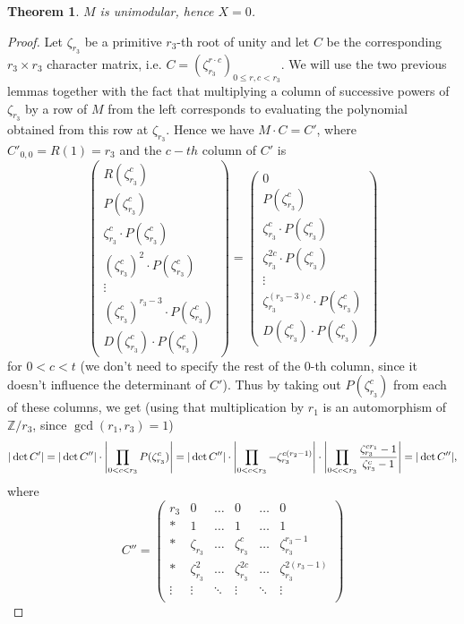 \documentclass[12pt,a4paper]{article}
\newtheorem{theorem}{Theorem}
\theoremstyle{definition}
\newcommand{\Z}{\mathbb{Z}}
\newcommand{\zt}{\zeta_{r_3}}
\DeclarePairedDelimiter\abs{\lvert}{\rvert}
\begin{document}
\begin{theorem}
$M$ is unimodular, hence $X=0$.
\end{theorem}
\begin{proof}
Let $\zt$ be a primitive $r_3$-th root of unity and let $C$ be the corresponding $r_3\times r_3$ character matrix, i.e. $C=(\zt^{r\cdot c})_{0\leq r,c<r_3}$. We will use the two previous lemmas together with the fact that multiplying a column of successive powers of $\zt$ by a row of $M$ from the left corresponds to evaluating the polynomial obtained from this row at $\zt$. %
Hence we have $M\cdot C=C'$, where $C'_{0,0}=R(1)=r_3$ and the $c-th$ column of $C'$ is
$$
\begin{pmatrix}
R(\zt^c)\\ 
P(\zt^c) \\ 
\zt^c \cdot P(\zt^c) \\ 
(\zt^{c})^2 \cdot P(\zt^c) \\ 
\vdots\\ 
(\zt^{c})^{r_3-3} \cdot P(\zt^c) \\ 
D(\zt^c) \cdot P(\zt^c)
\end{pmatrix}
=
\begin{pmatrix}
0\\ 
P(\zt^c) \\ 
\zt^c \cdot P(\zt^c) \\ 
\zt^{2c} \cdot P(\zt^c) \\ 
\vdots\\ 
\zt^{(r_3-3)c} \cdot P(\zt^c) \\ 
D(\zt^c) \cdot P(\zt^c)
\end{pmatrix}
$$
for $0<c<t$ (we don't need to specify the rest of the $0$-th column, since it doesn't influence the determinant of $C'$). Thus by taking out $P(\zt^c)$ from each of these columns, we get (using that multiplication by $r_1$ is an automorphism of $\Z/r_3$, since $\gcd(r_1,r_3)=1$)
$$|\det C'|=|\det C''|\cdot\abs*{\prod_{0<c<r_3}P(\zt^c)}=|\det C''|\cdot\abs*{\prod_{0<c<r_3}-\zt^{c(r_2-1)}}\cdot\abs*{\prod_{0<c<r_3}\frac{\zt^{cr_1}-1}{\zt^c-1}}=|\det C''|,$$
where
$$C''=
\begin{pmatrix}
r_3& 0& \dots & 0 & \dots & 0\\ 
*& 1& \dots & 1 & \dots & 1\\ 
*& \zt& \dots & \zt^c & \dots & \zt^{r_3-1}\\ 
*& \zt^2& \dots & \zt^{2c} & \dots & \zt^{2(r_3-1)}\\ 
\vdots& \vdots&\ddots  & \vdots & \ddots & \vdots\\ 

\end{pmatrix}$$
\end{proof}
\end{document}
